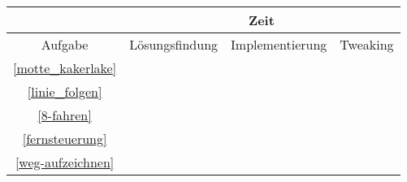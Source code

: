 
\begin{center}
	\begin{tabular}{  c | c | c | c |}
		\cline{2-4}
		& \multicolumn{3}{|c|}{Zeit}  \\ 
		\hline
		\multicolumn{1}{|c|}{Aufgabe} & Lösungsfindung & Implementierung & Tweaking \\
		\hline
		\hline
		\multicolumn{1}{|c|}{\nameref{motte_kakerlake} \ref{motte_kakerlake}}  &  &  & \\ 
		\hline
		\multicolumn{1}{|c|}{\nameref{linie_folgen} \ref{linie_folgen}} &  &  & \\ 
		\hline
		\multicolumn{1}{|c|}{\nameref{8-fahren} \ref{8-fahren}} &  &  &\\ 
		\hline
		\multicolumn{1}{|c|}{\nameref{fernsteuerung} \ref{fernsteuerung}} &  &  & \\ 
		\hline
		\multicolumn{1}{|c|}{\nameref{weg-aufzeichnen} \ref{weg-aufzeichnen}} &  &  & \\ 
		\hline
  \end{tabular}
\end{center}

